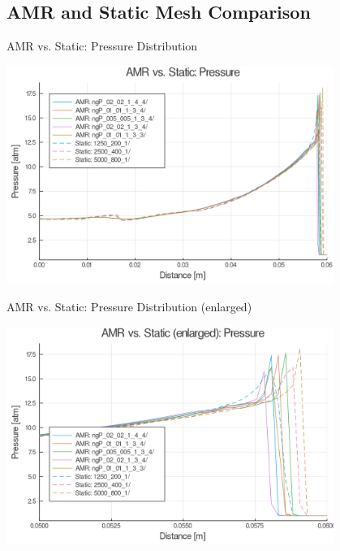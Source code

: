 \subsection{AMR and Static Mesh Comparison}

\begin{frame}{AMR vs. Static: Pressure Distribution}
\begin{center}
\includegraphics[width=0.8\textwidth]{../figs/amrfigs/amrcompare/p.png}
\end{center}
\end{frame}

\begin{frame}{AMR vs. Static: Pressure Distribution (enlarged)}
\begin{center}
\includegraphics[width=0.8\textwidth]{../figs/amrfigs/amrcompare/pe.png}
\end{center}
\end{frame}

